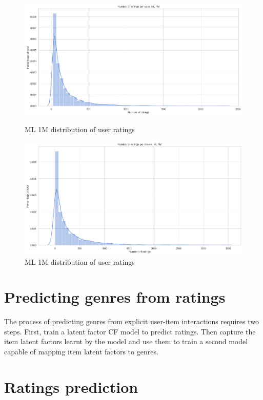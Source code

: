 \begin{figure}[H]
\centering
\begin{minipage}[b]{0.7\textwidth}
   \includegraphics[width=1\linewidth]{Figures/ML1M-user-ratings.png}
   \caption{ML 1M distribution of user ratings}
   \label{fig:ML1m-users} 
\end{minipage}
\begin{minipage}[b]{0.7\textwidth}
   \includegraphics[width=1\linewidth]{Figures/ML1M-movie-ratings.png}
   \caption{ML 1M distribution of user ratings}
   \label{fig:ML1m-movies}
\end{minipage}
\end{figure}

\section{Predicting genres from ratings}
The process of predicting genres from explicit user-item interactions requires two steps. First, train a latent factor CF model to predict ratings. Then capture the item latent factors learnt by the model and use them to train a second model capable of mapping item latent factors to genres.

\section{Ratings prediction}

